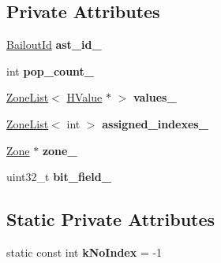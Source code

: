 \subsection*{Private Attributes}
\begin{DoxyCompactItemize}
\item 
\hyperlink{classv8_1_1internal_1_1_bailout_id}{Bailout\+Id} {\bfseries ast\+\_\+id\+\_\+}\hypertarget{classv8_1_1internal_1_1_h_simulate_ae4b1c72de8c34658b5eb73816ba91c75}{}\label{classv8_1_1internal_1_1_h_simulate_ae4b1c72de8c34658b5eb73816ba91c75}

\item 
int {\bfseries pop\+\_\+count\+\_\+}\hypertarget{classv8_1_1internal_1_1_h_simulate_a05d7122c7e1fb293e0396f6d8ac535ad}{}\label{classv8_1_1internal_1_1_h_simulate_a05d7122c7e1fb293e0396f6d8ac535ad}

\item 
\hyperlink{classv8_1_1internal_1_1_zone_list}{Zone\+List}$<$ \hyperlink{classv8_1_1internal_1_1_h_value}{H\+Value} $\ast$ $>$ {\bfseries values\+\_\+}\hypertarget{classv8_1_1internal_1_1_h_simulate_ac002562f0ca16461ffa3a01566c06c64}{}\label{classv8_1_1internal_1_1_h_simulate_ac002562f0ca16461ffa3a01566c06c64}

\item 
\hyperlink{classv8_1_1internal_1_1_zone_list}{Zone\+List}$<$ int $>$ {\bfseries assigned\+\_\+indexes\+\_\+}\hypertarget{classv8_1_1internal_1_1_h_simulate_ad5295839a46fb73bb4c1c337da0e2993}{}\label{classv8_1_1internal_1_1_h_simulate_ad5295839a46fb73bb4c1c337da0e2993}

\item 
\hyperlink{classv8_1_1internal_1_1_zone}{Zone} $\ast$ {\bfseries zone\+\_\+}\hypertarget{classv8_1_1internal_1_1_h_simulate_ada442a1dc5d86abbbdc25ab13710b20a}{}\label{classv8_1_1internal_1_1_h_simulate_ada442a1dc5d86abbbdc25ab13710b20a}

\item 
uint32\+\_\+t {\bfseries bit\+\_\+field\+\_\+}\hypertarget{classv8_1_1internal_1_1_h_simulate_a18b8c2f903394948467daafcfa0951df}{}\label{classv8_1_1internal_1_1_h_simulate_a18b8c2f903394948467daafcfa0951df}

\end{DoxyCompactItemize}
\subsection*{Static Private Attributes}
\begin{DoxyCompactItemize}
\item 
static const int {\bfseries k\+No\+Index} = -\/1\hypertarget{classv8_1_1internal_1_1_h_simulate_a82087302287ae1478740bac5666a40ff}{}\label{classv8_1_1internal_1_1_h_simulate_a82087302287ae1478740bac5666a40ff}

\end{DoxyCompactItemize}
